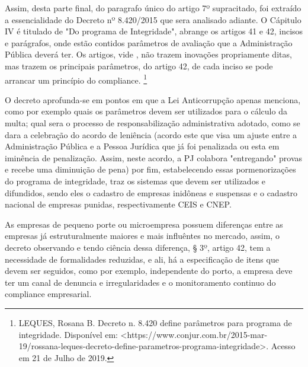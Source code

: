 Assim, desta parte final, do paragrafo único do artigo 7º supracitado, foi extraído a essencialidade do Decreto nº 8.420/2015 que sera analisado adiante. O Cápitulo IV é titulado de "Do programa de Integridade", abrange os artigos 41 e 42, incisos e parágrafos, onde estão contidos parâmetros de avaliação que a Administração Pública deverá ter. Os artigos, vide \cite{DecetoCometarios}, não trazem inovações propriamente ditas, mas trazem os principais parâmetros, do artigo 42, de cada inciso se pode arrancar um princípio do compliance. \footnote{LEQUES, Rosana B. Decreto n. 8.420 define parâmetros para 
programa de integridade. Disponível em: <https://www.conjur.com.br/2015-mar-19/rossana-leques-decreto-define-parametros-programa-integridade>. Acesso em 21 de Julho de 2019.}

O decreto aprofunda-se em pontos em que a Lei Anticorrupção apenas menciona, como por exemplo quais os parâmetros devem ser utilizados para o cálculo da multa; qual sera o processo de responsabilização administrativa adotado, como se dara a celebração do acordo de leniência (acordo este que visa um ajuste entre a Administração Pública e a Pessoa Jurídica que já foi penalizada ou esta em iminência de penalização. Assim, neste acordo, a PJ colabora "entregando" provas e recebe uma diminuição de pena) por fim, estabelecendo essas pormenorizações do programa de integridade, traz os sistemas que devem ser utilizados e difundidos, sendo eles o cadastro de empresas inidôneas e suspensas e o cadastro nacional de empresas punidas, respectivamente CEIS e CNEP. 

As empresas de pequeno porte ou microempresa possuem diferenças entre as empresas já estruturalmente maiores e mais influêntes no mercado, assim, o decreto observando e tendo ciência dessa diferença, § 3º, artigo 42, tem a necessidade de formalidades reduzidas, e ali, há a especificação de itens que devem ser seguidos, como por exemplo, independente do porto, a empresa deve ter um canal de denuncia e irregularidades e o monitoramento continuo do compliance empresarial. 

